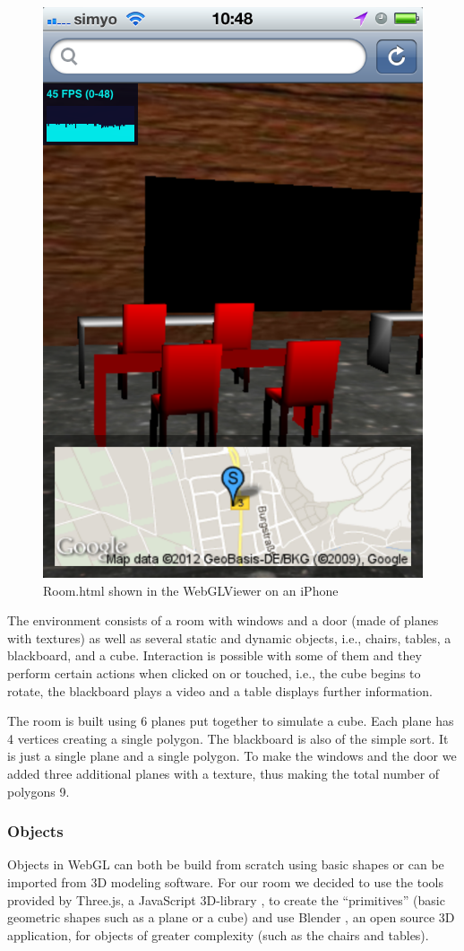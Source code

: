 \documentclass[12pt,journal,compsoc]{IEEEtran}
\begin{document}
\begin{figure}[htb]
	\centerline{\includegraphics[width=0.8\columnwidth]{grafiken/room_Mobile}}
	\caption{Room.html shown in the WebGLViewer on an iPhone}
	\label{fig:roomMobile}
\end{figure}

The environment consists of a room with windows and a door (made of planes with textures) as well as several static and dynamic objects, i.e., chairs, tables, a blackboard, and a cube. Interaction is possible with some of them and they perform certain actions when clicked on or touched, i.e., the cube begins to rotate, the blackboard plays a video and a table displays further information.

The room is built using 6 planes put together to simulate a cube. Each plane has 4 vertices creating a single polygon. The blackboard is also of the simple sort. It is just a single plane and a single polygon. To make the windows and the door we added three additional planes with a texture, thus making the total number of polygons 9.

\subsubsection{Objects}
Objects in WebGL can both be build from scratch using basic shapes or can be imported from 3D modeling software. For our room we decided to use the tools provided by Three.js, a JavaScript 3D-library \cite{ThreeJS}, to create the “primitives” (basic geometric shapes such as a plane or a cube) and use Blender \cite{Blender3d}, an open source 3D application, for objects of greater complexity (such as the chairs and tables).
\end{document}
